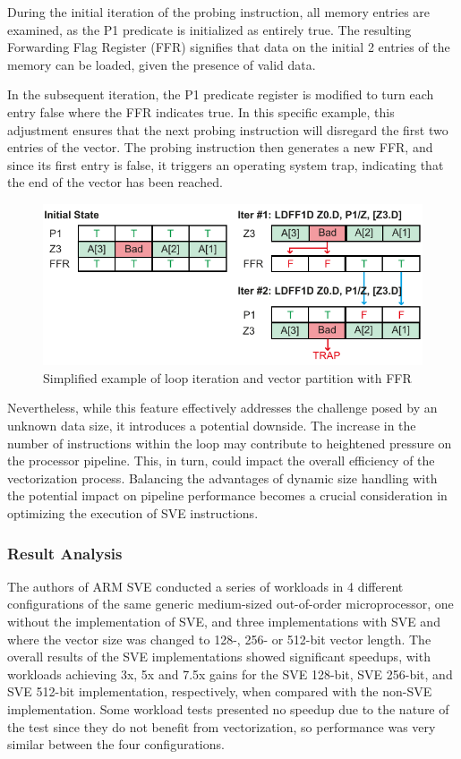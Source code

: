 During the initial iteration of the probing instruction, all memory entries are examined, as the P1 predicate is initialized as entirely true. The resulting Forwarding Flag Register (FFR) signifies that data on the initial 2 entries of the memory can be loaded, given the presence of valid data.

In the subsequent iteration, the P1 predicate register is modified to turn each entry false where the FFR indicates true. In this specific example, this adjustment ensures that the next probing instruction will disregard the first two entries of the vector. The probing instruction then generates a new FFR, and since its first entry is false, it triggers an operating system trap, indicating that the end of the vector has been reached.



\begin{figure}[H]
	\begin{center}
 		\includegraphics[width=0.77\linewidth]{images/ffr-example final.pdf}
 		\caption{Simplified example of loop iteration and vector partition with FFR}
 		\label{fig:ffr-example}
	\end{center} 
\end{figure}

Nevertheless, while this feature effectively addresses the challenge posed by an unknown data size, it introduces a potential downside. The increase in the number of instructions within the loop may contribute to heightened pressure on the processor pipeline. This, in turn, could impact the overall efficiency of the vectorization process. Balancing the advantages of dynamic size handling with the potential impact on pipeline performance becomes a crucial consideration in optimizing the execution of SVE instructions.

\subsubsection{Result Analysis}

 The authors of ARM SVE \cite{arm-paper} conducted a series of workloads in 4 different configurations of the same generic medium-sized out-of-order microprocessor, one without the implementation of SVE, and three implementations with SVE and where the vector size was changed to 128-, 256- or 512-bit vector length.
The overall results of the SVE implementations showed significant speedups, with workloads achieving 3x, 5x and 7.5x gains for the SVE 128-bit, SVE 256-bit, and SVE 512-bit implementation, respectively, when compared with the non-SVE implementation. Some workload tests presented no speedup due to the nature of the test since they do not benefit from vectorization, so performance was very similar between the four configurations.



